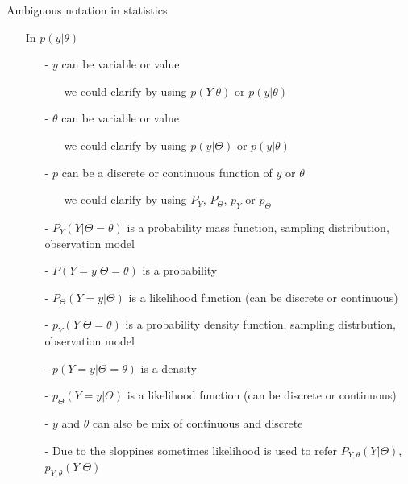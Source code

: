 \documentclass[10pt,handout]{beamer}
\begin{document}
\begin{frame}{Ambiguous notation in statistics}

  \begin{itemize}
  \item[] In $p(y|\theta)$
    \pause
  \begin{itemize}
  \item[-] $y$ can be variable or value
    \begin{itemize}
    \item[] we could clarify by using $p(Y|\theta)$ or $p(y|\theta)$
    \end{itemize}
    \pause
  \item[-] $\theta$ can be variable or value
    \begin{itemize}
    \item[] we could clarify by using $p(y|\Theta)$ or $p(y|\theta)$
    \end{itemize}
    \pause
  \item[-] $p$ can be a discrete or continuous function of $y$ or $\theta$
    \begin{itemize}
    \item[] we could clarify by using $P_Y$, $P_\Theta$, $p_Y$ or $p_\Theta$
    \end{itemize}
    \pause
\item[-]
  $P_Y(Y|\Theta=\theta)$ is a probability mass function, sampling distribution, observation model
    \pause
\item[-]
$P(Y=y|\Theta=\theta)$ is a probability
    \pause
\item[-]
$P_\Theta(Y=y|\Theta)$ is a likelihood function (can be discrete or continuous)
    \pause
\item[-] $p_Y(Y|\Theta=\theta)$ is a probability density function, sampling distrbution, observation model
    \pause
\item[-] $p(Y=y|\Theta=\theta)$ is a density
    \pause
\item[-] $p_\Theta(Y=y|\Theta)$ is a likelihood function (can be discrete or continuous)
    \pause
  \item[-] $y$ and $\theta$ can also be mix of continuous and discrete
    \pause
    \item[-] Due to the sloppines sometimes likelihood is used to refer
$P_{Y,\theta}(Y|\Theta)$, $p_{Y,\theta}(Y|\Theta)$

  \end{itemize}
\end{itemize}
\end{frame}
\end{document}
